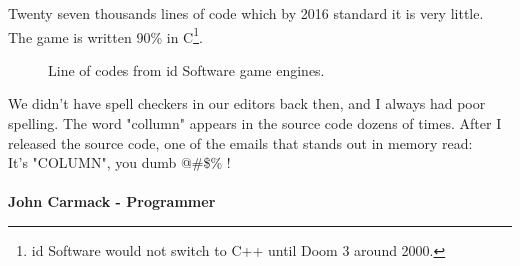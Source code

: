 \documentclass[book.tex]{subfiles}
\begin{document}
\par
Twenty seven thousands lines of code which by 2016 standard it is very little. The game is written 90\% in C\footnote{id Software would not switch to C++ until Doom 3 around 2000.}.\\
\par
\begin{figure}[H]
\centering
   \caption{Line of codes from id Software game engines.}
 \end{figure}
 
\par

 \begin{fancyquotes}
   We didn't have spell checkers in our editors back then, and I always had poor spelling.  The word "collumn" appears in the source code dozens of times.  After I released the source code, one of the emails that stands out in memory read:
 \bigskip \\
It's "COLUMN", you dumb @\#\$\% !\\
 \bigskip \\
\textbf{John Carmack - Programmer}
 \end{fancyquotes}
 
\end{document}
